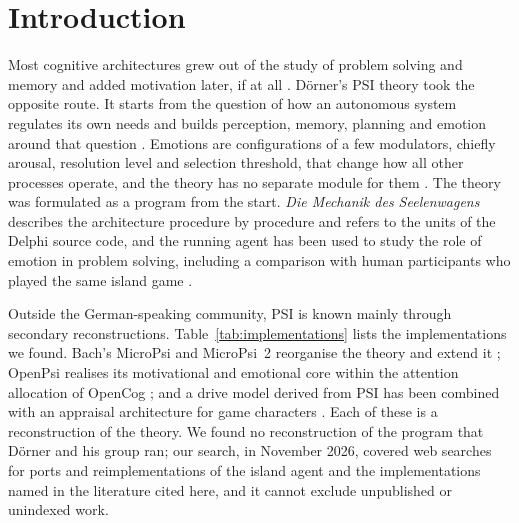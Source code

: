 \documentclass[preprint,12pt,authoryear]{elsarticle}
\begin{document}
\section{Introduction}

Most cognitive architectures grew out of the study of problem solving and memory and added motivation later, if at all \citep{kotseruba2020forty,laird2017standard}. D\"orner's PSI theory took the opposite route. It starts from the question of how an autonomous system regulates its own needs and builds perception, memory, planning and emotion around that question \citep{doerner1999bauplan,doerner2002mechanik}. Emotions are configurations of a few modulators, chiefly arousal, resolution level and selection threshold, that change how all other processes operate, and the theory has no separate module for them \citep{doerner2013psi}. The theory was formulated as a program from the start. \emph{Die Mechanik des Seelenwagens} \citep{doerner2002mechanik} describes the architecture procedure by procedure and refers to the units of the Delphi source code, and the running agent has been used to study the role of emotion in problem solving, including a comparison with human participants who played the same island game \citep{doerner2004emotions}.

Outside the German-speaking community, PSI is known mainly through secondary reconstructions. Table~\ref{tab:implementations} lists the implementations we found. Bach's MicroPsi and MicroPsi~2 reorganise the theory and extend it \citep{bach2005studying,bach2009principles,bach2012micropsi2}; OpenPsi realises its motivational and emotional core within the attention allocation of OpenCog \citep{cai2011openpsi}; and a drive model derived from PSI has been combined with an appraisal architecture for game characters \citep{lim2012npcs}. Each of these is a reconstruction of the theory. We found no reconstruction of the program that D\"orner and his group ran; our search, in November 2026, covered web searches for ports and reimplementations of the island agent and the implementations named in the literature cited here, and it cannot exclude unpublished or unindexed work.
\end{document}
